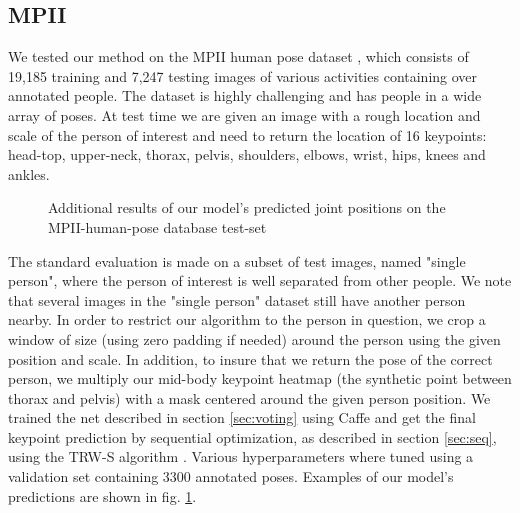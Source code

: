 \documentclass{article}
\begin{document}
\subsection{MPII}
We tested our method on the MPII human pose dataset \cite{andriluka14}, which consists of 19,185 training and 7,247 testing images of various activities containing over  annotated people. The dataset is highly challenging and has people in a wide array of poses. At test time we are given an image with a rough location and scale of the person of interest and need to return the location of 16 keypoints: head-top, upper-neck, thorax, pelvis, shoulders, elbows, wrist, hips, knees and ankles.\\


\begin{figure}[!ht]
	\centering


	\caption{Additional results of our model's predicted joint positions on the MPII-human-pose database test-set \cite{andriluka14}}
	\label{fig:more-mpii-pred-images}
\end{figure}


The standard evaluation is made on a subset of test images, named "single person", where the person of interest is well separated from other people. We note that several images in the "single person" dataset still have another person nearby. In order to restrict our algorithm to the person in question, we crop a window of size  (using zero padding if needed) around the person using the given position and scale. In addition, to insure that we return the pose of the correct person, we  multiply our mid-body keypoint heatmap (the synthetic point between thorax and pelvis) with a mask centered around the given person position. We trained the net described in section \ref{sec:voting} using Caffe \cite{jia2014} and get the final keypoint prediction by sequential optimization, as described in section \ref{sec:seq}, using the TRW-S algorithm \cite{Kolmogorov06}. Various hyperparameters where tuned using a validation set containing 3300 annotated poses. Examples of our model's predictions are shown in fig. \ref{fig:more-mpii-pred-images}.
\end{document}
